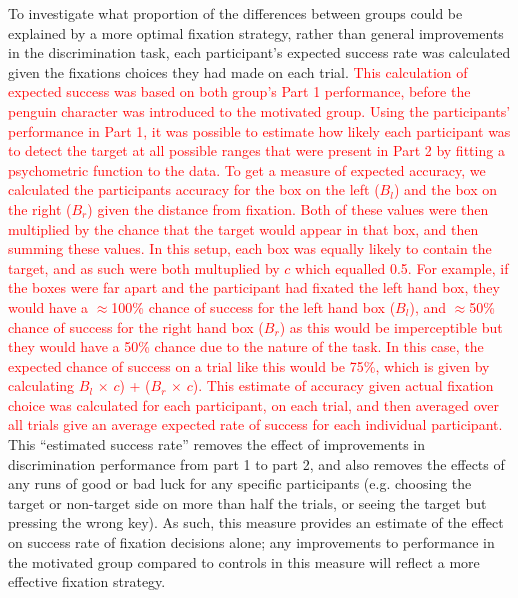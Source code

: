 \documentclass[vision,article,submit,moreauthors,pdftex,10pt,a4paper]{mdpi}
\begin{document}
To investigate what proportion of the differences between groups could be explained by a more optimal fixation strategy, rather than general improvements in the discrimination task, each participant’s expected success rate was calculated given the fixations choices they had made on each trial. \textcolor{red}{This calculation of expected success was based on both group’s Part 1 performance, before the penguin character was introduced to the motivated group. Using the participants' performance in Part 1, it was possible to estimate how likely each participant was to detect the target at all possible ranges that were present in Part 2 by fitting a psychometric function to the data. To get a measure of expected accuracy, we calculated the participants accuracy for the box on the left ($B_{l}$) and the box on the right ($B_{r}$) given the distance from fixation. Both of these values were then multiplied by the chance that the target would appear in that box, and then summing these values. In this setup, each box was equally likely to contain the target, and as such were both multuplied by $c$ which equalled 0.5. For example, if the boxes were far apart and the participant had fixated the left hand box, they would have a $\approx$100\% chance of success for the left hand box ($B_{l}$), and $\approx$50\% chance of success for the right hand box ($B_{r}$) as this would be imperceptible but they would have a 50\% chance due to the nature of the task. In this case, the expected chance of success on a trial like this would be 75\%, which is given by calculating $B_{l}$ $\times$ $c$) + ($B_{r}$ $\times$ $c$). This estimate of accuracy given actual fixation choice was calculated for each participant, on each trial, and then averaged over all trials give an average expected rate of success for each individual participant.} This “estimated success rate” removes the effect of improvements in discrimination performance from part 1 to part 2, and also removes the effects of any runs of good or bad luck for any specific participants (e.g. choosing the target or non-target side on more than half the trials, or seeing the target but pressing the wrong key). As such, this measure provides an estimate of the effect on success rate of fixation decisions alone; any improvements to performance in the motivated group compared to controls in this measure will reflect a more effective fixation strategy.   
\end{document}
